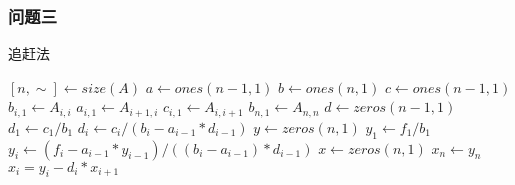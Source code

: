 \subsubsection{问题三}

\begin{breakablealgorithm}
    \caption{追赶法}
    \begin{algorithmic}[1]
        \STATE $[n, \sim] \leftarrow size(A)$ 
        \STATE $a \leftarrow ones(n - 1, 1)$  
        \STATE $b \leftarrow ones(n, 1)$ 
        \STATE $c \leftarrow ones(n - 1, 1)$
        \STATE $b_{i, 1} \leftarrow A_{i, i}$
        \STATE $a_{i, 1} \leftarrow A_{i + 1, i}$
        \STATE $c_{i, 1} \leftarrow A_{i, i + 1}$
        \ENDFOR
        \STATE $b_{n, 1} \leftarrow A_{n, n}$
        \STATE $d \leftarrow zeros(n - 1, 1)$ 
        \STATE $d_1 \leftarrow c_1 / b_1$
        \STATE $d_i \leftarrow c_i / (b_i - a_{i - 1} * d_{i - 1})$
        \ENDFOR
        \STATE $y \leftarrow zeros(n, 1)$ 
        \STATE $y_1 \leftarrow f_1 / b_1$
        \STATE $y_i \leftarrow (f_i - a_{i - 1} * y_{i - 1}) / ((b_i - a_{i - 1}) * d_{i - 1})$
        \STATE $x \leftarrow zeros(n, 1)$ 
        \STATE $x_n \leftarrow y_n$
        \ENDFOR
        \STATE $x_i = y_i - d_i * x_{i + 1}$
        \ENDFOR
    \end{algorithmic}
\end{breakablealgorithm}
